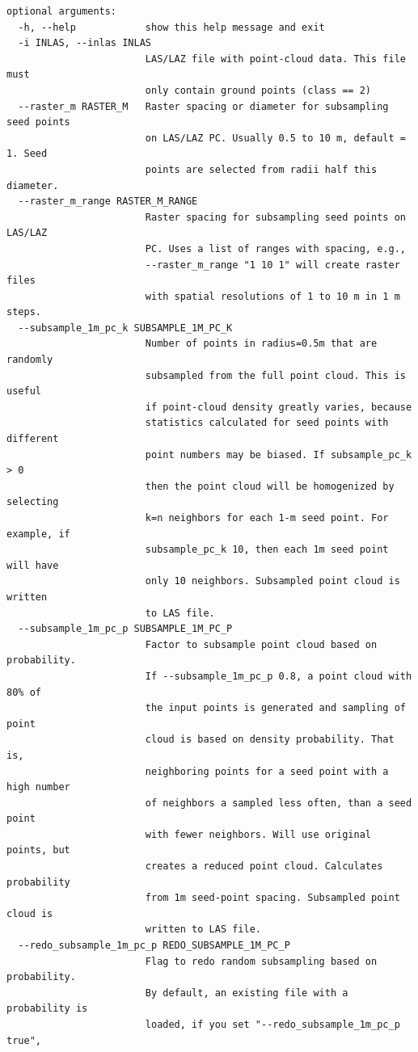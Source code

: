 \documentclass[a4paperpaper,,tablecaptionabove]{scrartcl}
\begin{document}
\begin{lstlisting}
optional arguments:
  -h, --help            show this help message and exit
  -i INLAS, --inlas INLAS
                        LAS/LAZ file with point-cloud data. This file must
                        only contain ground points (class == 2)
  --raster_m RASTER_M   Raster spacing or diameter for subsampling seed points
                        on LAS/LAZ PC. Usually 0.5 to 10 m, default = 1. Seed
                        points are selected from radii half this diameter.
  --raster_m_range RASTER_M_RANGE
                        Raster spacing for subsampling seed points on LAS/LAZ
                        PC. Uses a list of ranges with spacing, e.g.,
                        --raster_m_range "1 10 1" will create raster files
                        with spatial resolutions of 1 to 10 m in 1 m steps.
  --subsample_1m_pc_k SUBSAMPLE_1M_PC_K
                        Number of points in radius=0.5m that are randomly
                        subsampled from the full point cloud. This is useful
                        if point-cloud density greatly varies, because
                        statistics calculated for seed points with different
                        point numbers may be biased. If subsample_pc_k > 0
                        then the point cloud will be homogenized by selecting
                        k=n neighbors for each 1-m seed point. For example, if
                        subsample_pc_k 10, then each 1m seed point will have
                        only 10 neighbors. Subsampled point cloud is written
                        to LAS file.
  --subsample_1m_pc_p SUBSAMPLE_1M_PC_P
                        Factor to subsample point cloud based on probability.
                        If --subsample_1m_pc_p 0.8, a point cloud with 80% of
                        the input points is generated and sampling of point
                        cloud is based on density probability. That is,
                        neighboring points for a seed point with a high number
                        of neighbors a sampled less often, than a seed point
                        with fewer neighbors. Will use original points, but
                        creates a reduced point cloud. Calculates probability
                        from 1m seed-point spacing. Subsampled point cloud is
                        written to LAS file.
  --redo_subsample_1m_pc_p REDO_SUBSAMPLE_1M_PC_P
                        Flag to redo random subsampling based on probability.
                        By default, an existing file with a probability is
                        loaded, if you set "--redo_subsample_1m_pc_p true",

\end{lstlisting}
\end{document}
